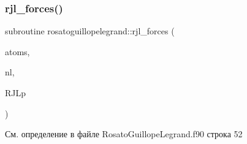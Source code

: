 \subsubsection{\texorpdfstring{rjl\+\_\+forces()}{rjl\_forces()}}
{\footnotesize\ttfamily subroutine rosatoguillopelegrand\+::rjl\+\_\+forces (\begin{DoxyParamCaption}\item[{type(\mbox{\hyperlink{structmd__general_1_1particles}{particles}})}]{atoms,  }\item[{type(\mbox{\hyperlink{structmd__general_1_1neighbour__list}{neighbour\+\_\+list}})}]{nl,  }\item[{type(\mbox{\hyperlink{structrosatoguillopelegrand_1_1rosatoguillopelegrand__parameters}{rosatoguillopelegrand\+\_\+parameters}})}]{R\+J\+Lp }\end{DoxyParamCaption})}



См. определение в файле Rosato\+Guillope\+Legrand.\+f90 строка 52


